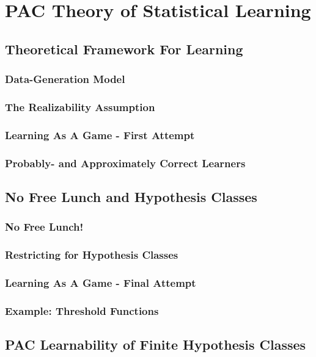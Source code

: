 \chapter{PAC Theory of Statistical Learning}\label{chp:PAC}
    
    \section{Theoretical Framework For Learning}
        \subsection{Data-Generation Model}
        \subsection{The Realizability Assumption}
        \subsection{Learning As A Game - First Attempt}
        \subsection{Probably- and Approximately Correct Learners}
    \section{No Free Lunch and Hypothesis Classes}
        \subsection{No Free Lunch!}
        \subsection{Restricting for Hypothesis Classes}
        \subsection{Learning As A Game - Final Attempt}
        \subsection{Example: Threshold Functions}

    \section{PAC Learnability of Finite Hypothesis Classes}

